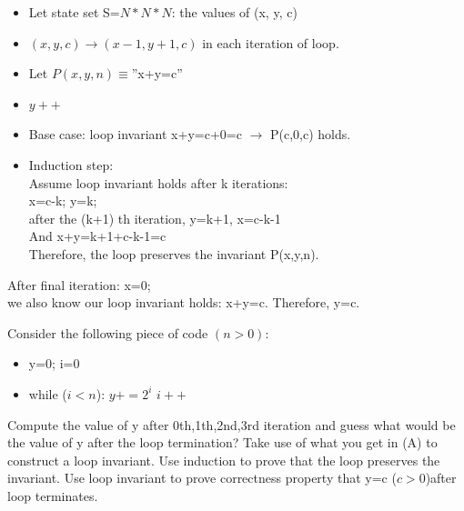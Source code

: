 \documentclass[solution, letterpaper]{cs20inclass}
\begin{document}
\begin{solution}
\subsolution
\begin{itemize}
\item Let state set S=$N*N*N$: the values of (x, y, c)
\item $(x,y,c) \rightarrow (x-1, y+1, c)$  in each iteration of loop.
\item Let $P(x,y,n)\equiv$''x+y=c'' 
\item $y++$
\end{itemize}
\subsolution
\begin{itemize}
\item Base case: loop invariant x+y=c+0=c $\rightarrow$ P(c,0,c) holds.
\item Induction step: \\
Assume loop invariant holds after k iterations:\\
x=c-k; y=k;\\
after the (k+1) th iteration, y=k+1, x=c-k-1\\
And x+y=k+1+c-k-1=c\\
Therefore, the loop preserves the invariant P(x,y,n).
\end{itemize}
\subsolution
After final iteration: x=0;\\
we also know our loop invariant holds: x+y=c. Therefore, y=c.
\end{solution}

\problem Consider the following piece of code $(n>0)$:
\begin{itemize}
\item y=0; i=0
\item while ($i< n$):
\subitem $y += 2^i$
\subitem $i++$
\end{itemize}
\subproblem Compute the value of y after 0th,1th,2nd,3rd iteration and guess what would be the value of y after the loop termination?
\subproblem Take use of what you get in (A) to construct  a loop invariant.
\subproblem Use induction to prove that the loop preserves the invariant.
\subproblem Use loop invariant to prove correctness property that y=c ($c>0$)after loop terminates.
\end{document}
